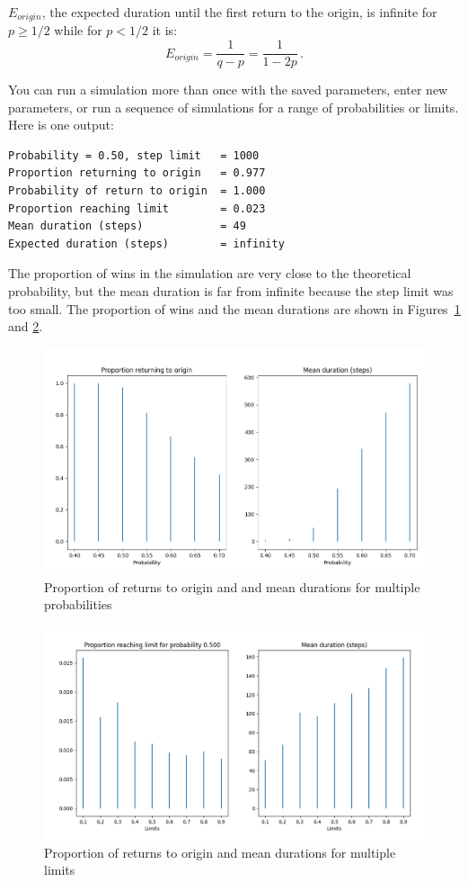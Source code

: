 \documentclass[11pt,a4paper]{article}
\newcommand*{\disfrac}[2]{\displaystyle\frac{#1}{#2}}
\begin{document}
$E_{\mathit{origin}}$, the expected duration until the first return to the origin, is infinite for $p\geq 1/2$ while for $p<1/2$ it is:
\[
E_{\mathit{origin}}=\disfrac{1}{q-p}=\disfrac{1}{1-2p}\,.
\]

You can run a simulation more than once with the saved parameters, enter new parameters, or run a sequence of simulations for a range of probabilities or limits. Here is one output:
\begin{verbatim}
Probability = 0.50, step limit   = 1000
Proportion returning to origin   = 0.977
Probability of return to origin  = 1.000
Proportion reaching limit        = 0.023
Mean duration (steps)            = 49
Expected duration (steps)        = infinity
\end{verbatim}
The proportion of wins in the simulation are very close to the theoretical probability, but the mean duration is far from infinite because the step limit was too small.  The proportion of wins and the mean durations are shown in Figures~\ref{f.random-walk-01} and \ref{f.random-walk-02}.
\begin{figure}
\begin{center}
\includegraphics[width=\textwidth]{random-walk-01}
\caption{Proportion of returns to origin and and mean durations for multiple probabilities}\label{f.random-walk-01}
\end{center}
\end{figure}
\begin{figure}
\begin{center}
\includegraphics[width=\textwidth]{random-walk-02}
\caption{Proportion of returns to origin and mean durations for multiple limits}\label{f.random-walk-02}
\end{center}
\end{figure}
\end{document}
